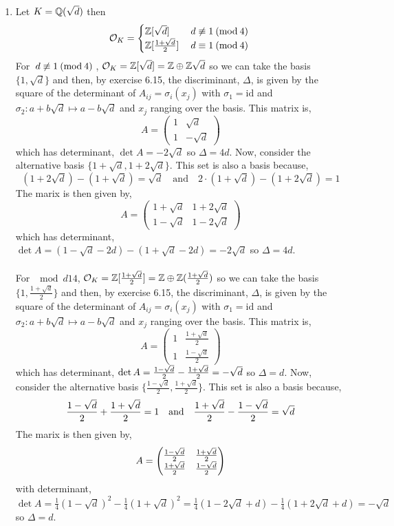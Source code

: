 \documentclass[12pt]{extarticle}
\begin{document}
\begin{enumerate}
\item Let $K = \mathbb{Q} \small(\sqrt{d} \small)$ then 
\[\ints{K} = 
\begin{cases}
\Z[\sqrt{d}] & \nmod{d}{1}{4} \\
\Z[\frac{1+\sqrt{d}}{2}] & \mod{d}{1}{4} 
\end{cases}\]
For $\nmod{d}{1}{4}$, $\mathcal{O}_{K} = \mathbb{Z}[\sqrt{d}] = \mathbb{Z} \oplus \mathbb{Z} \sqrt{d}$ so we can take the basis $\{1, \sqrt{d} \}$ and then, by exercise 6.15, the discriminant, $\Delta$, is given by the square of the determinant of $A_{ij} = \sigma_i(x_j)$ with $\sigma_1 = \mathrm{id}$ and $\sigma_2 : a + b \sqrt{d} \mapsto a - b \sqrt{d}$ and $x_j$ ranging over the basis. This matrix is,
\[ A = 
\begin{pmatrix}
1 & \sqrt{d} \\
1 & -\sqrt{d} 
\end{pmatrix} 
\]
which has determinant, $\det{A} = -2\sqrt{d}$ so $\Delta = 4 d$. Now, consider the alternative basis $\{1 + \sqrt{d}, 1 + 2 \sqrt{d} \}$. This set is also a basis because,
\[(1 + 2 \sqrt{d}) - (1 + \sqrt{d}) = \sqrt{d} \quad \text{and} \quad 2 \cdot (1 + \sqrt{d}) - (1 + 2 \sqrt{d}) = 1\]
The marix is then given by,
\[ A = 
\begin{pmatrix}
1 + \sqrt{d} & 1 + 2 \sqrt{d} \\
1 - \sqrt{d} & 1 - 2 \sqrt{d} 
\end{pmatrix} 
\] 
which has determinant, $\det{A} = (1 - \sqrt{d} - 2d) - (1 + \sqrt{d} - 2 d) = - 2\sqrt{d}$ so $\Delta = 4 d$. \\ \\

For $\mod{d}{1}{4}$, $\mathcal{O}_{K} = \mathbb{Z}[\frac{1 + \sqrt{d}}{2}] = \mathbb{Z} \oplus \mathbb{Z} (\frac{1 + \sqrt{d}}{2})$ so we can take the basis $\{1, \frac{1 + \sqrt{d}}{2} \}$ and then, by exercise 6.15, the discriminant, $\Delta$, is given by the square of the determinant of $A_{ij} = \sigma_i(x_j)$ with $\sigma_1 = \mathrm{id}$ and $\sigma_2 : a + b \sqrt{d} \mapsto a - b \sqrt{d}$ and $x_j$ ranging over the basis. This matrix is,
\[ A = 
\begin{pmatrix}
1 & \frac{1 + \sqrt{d}}{2} \\
1 & \frac{1 - \sqrt{d}}{2} 
\end{pmatrix} 
\]
which has determinant, $\det{A} = \frac{1-\sqrt{d}}{2} - \frac{1 + \sqrt{d}}{2} = -\sqrt{d}$ so $\Delta = d$. Now, consider the alternative basis $\{\frac{1 - \sqrt{d}}{2}, \frac{1 + \sqrt{d}}{2} \}$. This set is also a basis because,
\[\frac{1 - \sqrt{d}}{2} + \frac{1 + \sqrt{d}}{2} = 1 \quad \text{and} \quad \frac{1 + \sqrt{d}}{2} - \frac{1 - \sqrt{d}}{2} = \sqrt{d} \]
The marix is then given by,
\[ A = 
\begin{pmatrix}
\frac{1 - \sqrt{d}}{2} & \frac{1 + \sqrt{d}}{2} \\
\frac{1 + \sqrt{d}}{2} & \frac{1 - \sqrt{d}}{2} 
\end{pmatrix} 
\] 
with determinant, $\det{A} = \frac{1}{4} (1 - \sqrt{d})^2 - \frac{1}{4} (1 + \sqrt{d})^2 = \frac{1}{4} (1 - 2 \sqrt{d} + d) - \frac{1}{4} (1 + 2\sqrt{d} + d) = -\sqrt{d}$ so $\Delta = d$.
  

\end{enumerate}
\end{document}
